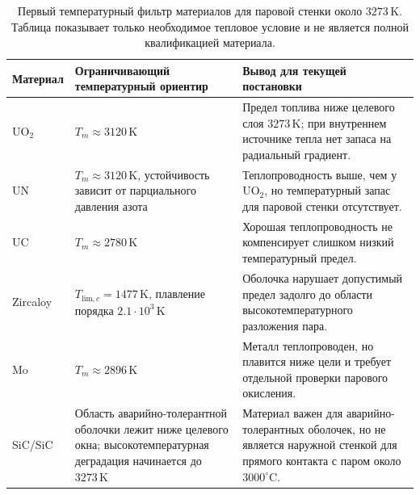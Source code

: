 \documentclass[12pt]{article}
\begin{document}
\begin{table}[H]
    \centering
    \caption{Первый температурный фильтр материалов для паровой стенки около \(3273\,\mathrm{K}\). Таблица показывает только необходимое тепловое условие и не является полной квалификацией материала.}
    \label{tab:firstTemperatureMaterialFilter}
    \small
    \renewcommand{\arraystretch}{1.15}
    \begin{tabularx}{\textwidth}{@{}p{}p{}X@{}}
    \toprule
    Материал & Ограничивающий температурный ориентир & Вывод для текущей постановки \\
    \midrule
    \(\mathrm{UO_2}\) & \(T_m\approx3120\,\mathrm{K}\) & Предел топлива ниже целевого слоя \(3273\,\mathrm{K}\); при внутреннем источнике тепла нет запаса на радиальный градиент. \\
    \(\mathrm{UN}\) & \(T_m\approx3120\,\mathrm{K}\), устойчивость зависит от парциального давления азота & Теплопроводность выше, чем у \(\mathrm{UO_2}\), но температурный запас для паровой стенки отсутствует. \\
    \(\mathrm{UC}\) & \(T_m\approx2780\,\mathrm{K}\) & Хорошая теплопроводность не компенсирует слишком низкий температурный предел. \\
    Zircaloy & \(T_{\mathrm{lim},c}=1477\,\mathrm{K}\), плавление порядка \(2.1\cdot10^3\,\mathrm{K}\) & Оболочка нарушает допустимый предел задолго до области высокотемпературного разложения пара. \\
    Mo & \(T_m\approx2896\,\mathrm{K}\) & Металл теплопроводен, но плавится ниже цели и требует отдельной проверки парового окисления. \\
    SiC/SiC & Область аварийно-толерантной оболочки лежит ниже целевого окна; высокотемпературная деградация начинается до \(3273\,\mathrm{K}\) & Материал важен для аварийно-толерантных оболочек, но не является наружной стенкой для прямого контакта с паром около \(3000^\circ\mathrm{C}\). \\
    \bottomrule
    \end{tabularx}
\end{table}






\end{document}
